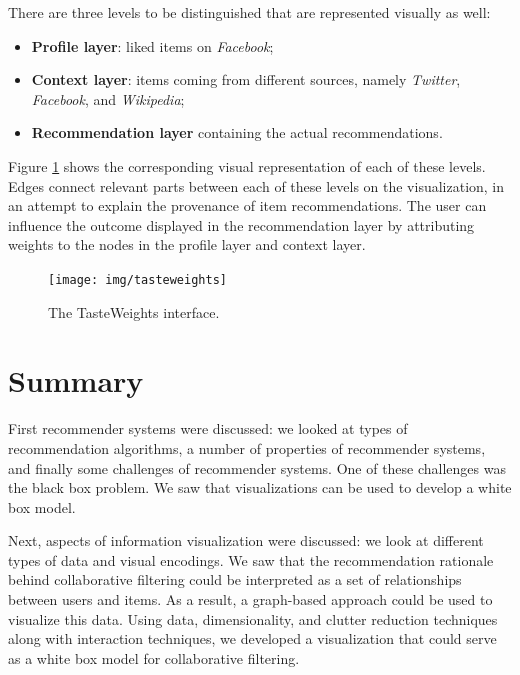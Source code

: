 There are three levels to be distinguished that are represented visually as well:

\begin{itemize}
	\item \textbf{Profile layer}: liked items on \emph{Facebook};
	\item \textbf{Context layer}: items coming from different sources, namely \emph{Twitter}, \emph{Facebook}, and \emph{Wikipedia};
	\item \textbf{Recommendation layer} containing the actual recommendations.
\end{itemize}

Figure \ref{figure:tasteweights} shows the corresponding visual representation of each of these levels. Edges connect relevant parts between each of these levels on the visualization, in an attempt to explain the provenance of item recommendations. The user can influence the outcome displayed in the recommendation layer by attributing weights to the nodes in the profile layer and context layer\cite{bostandjiev:2012}.

\begin{figure}%
	\begin{center}
		\texttt{[image: img/tasteweights]}%
	\end{center}
	\caption{The TasteWeights interface.}%
	\label{figure:tasteweights}%
\end{figure}











\section{Summary}\label{chapter:literature_study:section:summary}

First recommender systems were discussed: we looked at types of recommendation algorithms, a number of properties of recommender systems, and finally some challenges of recommender systems. One of these challenges was the black box problem. We saw that visualizations can be used to develop a white box model.

Next, aspects of information visualization were discussed: we look at different types of data and visual encodings. We saw that the recommendation rationale behind collaborative filtering could be interpreted as a set of relationships between users and items. As a result, a graph-based approach could be used to visualize this data. Using data, dimensionality, and clutter reduction techniques along with interaction techniques, we developed a visualization that could serve as a white box model for collaborative filtering.

